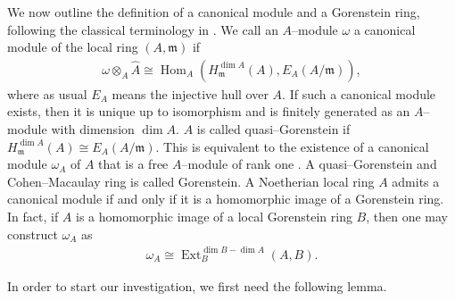 \documentclass{amsart}%
\theoremstyle{plain}
\numberwithin{equation}{section}
\theoremstyle{definition}
\DeclareMathOperator{\ext}{Ext}
\DeclareMathOperator{\Hom}{Hom}
\begin{document}
We now outline the definition of a canonical module and a Gorenstein ring, following the classical terminology in \cite{herzogkunz,brunsherzog}. We call an $A$--module $\omega$ a canonical module of the local ring $(A,\mathfrak{m})$ if
\begin{align*}
    \omega\otimes _A \widehat{A}\cong\Hom_A\left( H_{\mathfrak{m}}^{\dim A}(A),E_A(A/\mathfrak{m}) \right),
\end{align*}
where as usual $E_A$ means the injective hull over $A$. If such a canonical module exists, then it is unique up to isomorphism and is finitely generated as an $A$--module with dimension $\dim A$. $A$ is called quasi--Gorenstein if $H_{\mathfrak{m}}^{\dim A}(A)\cong E_A(A/\mathfrak{m})$. This is equivalent to the existence of a canonical module $\omega_A$ of $A$ that is a free $A$--module of rank one \cite{somebasic}. A quasi--Gorenstein and Cohen--Macaulay ring is called Gorenstein. A Noetherian local ring $A$ admits a canonical module if and only if it is a homomorphic image of a Gorenstein ring. In fact, if $A$ is a homomorphic image of a local Gorenstein ring $B$, then one may construct $\omega_A$ as
\begin{align*}
    \omega_A\cong\ext_B^{\dim B-\dim A}(A,B).
\end{align*}

In order to start our investigation, we first need the following lemma.
\end{document}
